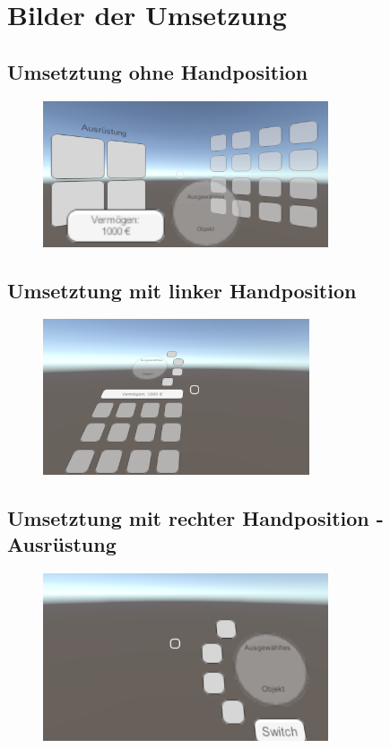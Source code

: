
\chapter{Bilder der Umsetzung}\label{chapter:appendix}

	\section{Umsetztung ohne Handposition}
	\begin{figure}[htbp]
		\centering
		\includegraphics[width=0.75\textwidth]{Fragen/UmsetzungO1.png}
	\end{figure}
	
	\section{Umsetztung mit linker Handposition}
	\begin{figure}[htbp]
		\centering
		\includegraphics[width=0.7\textwidth]{Fragen/UmsetzungL1.png}
	\end{figure}
	
	\section{Umsetztung mit rechter Handposition - Ausrüstung}
	\begin{figure}[htbp]
		\centering
		\includegraphics[width=0.75\textwidth]{Fragen/UmsetzungR1.png}
	\end{figure}
	
